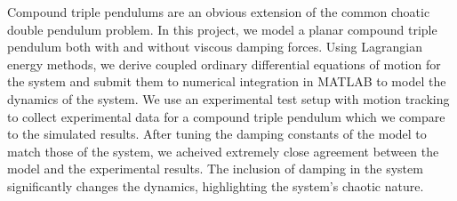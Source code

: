 \noindent Compound triple pendulums are an obvious extension of the common choatic double pendulum problem. In this project, we model a planar compound triple pendulum both with and without viscous damping forces.  Using Lagrangian energy methods, we derive coupled ordinary differential equations of motion for the system and submit them to numerical integration in MATLAB to model the dynamics of the system. We use an experimental test setup with motion tracking  to collect experimental data for a compound triple pendulum which we compare to the simulated results.  After tuning the damping constants of the model to match those of the system, we acheived extremely close agreement between the model and the experimental results.  The inclusion of damping in the system significantly changes the dynamics, highlighting the system's chaotic nature.
